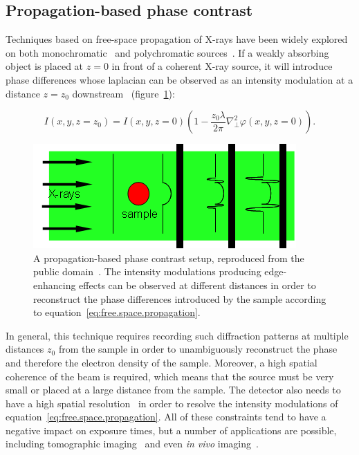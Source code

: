 \subsection{Propagation-based phase contrast}
Techniques based on free-space propagation of X-rays have been widely
explored on both monochromatic~\parencite{1995RScI...66.5486S,Cloetens1996}
and polychromatic sources~\parencite{Wilkins1996}. If a weakly
absorbing object is placed at $z=0$ in front of a coherent X-ray source,
it will introduce phase differences whose laplacian can be observed as an
intensity modulation at a distance $z=z_0$
downstream~\parencite{Paganin2006b-propagation-based}
(figure~\ref{fig:propagation.based}):

\begin{equation}
    I(x, y, z = z_0) = I(x, y, z=0)\left(1 - \frac{z_0\lambda}{2\pi}\nabla_\perp^2
    \varphi(x, y, z=0)\right).
    \label{eq:free.space.propagation}
\end{equation}

\begin{figure}[htb]
    \centering
    \includegraphics[width=.8\textwidth]{gfx/propagation-based_imaging.png}
    \caption[Propagation-based setup.]{A propagation-based phase contrast
        setup, reproduced from the public domain~\parencite{propagation-based-picture}. The intensity modulations producing edge-enhancing effects can
be observed at different distances in order to reconstruct the phase
differences introduced by the sample according to
equation~\eqref{eq:free.space.propagation}.}
    \label{fig:propagation.based}
\end{figure}

In general, this technique requires recording such diffraction patterns at
multiple distances $z_0$ from the sample in order to unambiguously
reconstruct the phase and therefore the electron density of the sample.
Moreover, a high spatial coherence of the beam is required, which means
that the source must be very small or placed at a large distance from
the sample. The detector also needs to have a high spatial
resolution~\parencite{Pogany1997,2005RScI...76i3706N,2008OExpr..16.3223G} in
order to resolve the intensity modulations of
equation~\eqref{eq:free.space.propagation}. All of these constraints tend to
have a negative impact on exposure times, but a number of applications are
possible, including tomographic
imaging~\parencite{1997JAP....81.5878C,2009RScI...80e6101B,2012PLoSO...735691L}
and even \emph{in vivo} imaging~\parencite{2007NIMPA.572..237C}.

